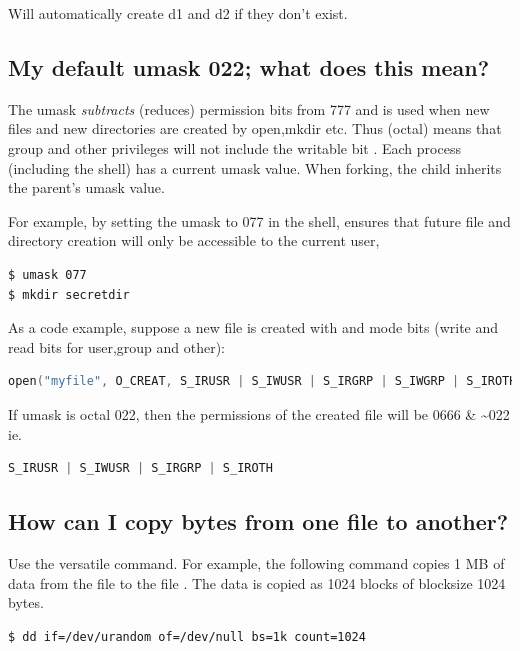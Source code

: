Will automatically create d1 and d2 if they don't exist.

\subsection{My default umask 022; what does this mean?}\label{my-default-umask-022-what-does-this-mean}

The umask \emph{subtracts} (reduces) permission bits from 777 and is used when new files and new directories are created by open,mkdir etc. Thus  (octal) means that group and other privileges will not include the writable bit . Each process (including the shell) has a current umask value. When forking, the child inherits the parent's umask value.

For example, by setting the umask to 077 in the shell, ensures that future file and directory creation will only be accessible to the current user,

\begin{lstlisting}
$ umask 077
$ mkdir secretdir
\end{lstlisting}

As a code example, suppose a new file is created with  and mode bits  (write and read bits for user,group and other):

\begin{lstlisting}[language=C]
open("myfile", O_CREAT, S_IRUSR | S_IWUSR | S_IRGRP | S_IWGRP | S_IROTH | S_IWOTH);
\end{lstlisting}

If umask is octal 022, then the permissions of the created file will be 0666 \& \textasciitilde{}022 ie.

\begin{lstlisting}[language=C]
S_IRUSR | S_IWUSR | S_IRGRP | S_IROTH
\end{lstlisting}

\subsection{How can I copy bytes from one file to another?}\label{how-can-i-copy-bytes-from-one-file-to-another}

Use the versatile  command. For example, the following command copies 1 MB of data from the file  to the file . The data is copied as 1024 blocks of blocksize 1024 bytes.

\begin{lstlisting}
$ dd if=/dev/urandom of=/dev/null bs=1k count=1024
\end{lstlisting}

